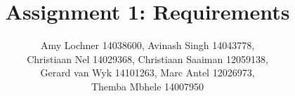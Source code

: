 \documentclass[COS301 - Team Alpha]{article}
\title{Assignment 1: Requirements}
\author{Amy Lochner 14038600, Avinash Singh 14043778, \\
Christiaan Nel 14029368, Christiaan Saaiman 12059138, \\
Gerard van Wyk 14101263, Marc Antel 12026973,\\
 Themba Mbhele 14007950}
\begin{document}
\maketitle


\section{}
\end{document}
